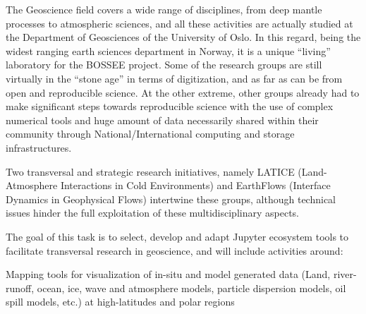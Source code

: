 \begin{task}[
  title=Geosciences application,
  id=geoscience,
  lead=UIO,
  PM=24,
  wphases={0-48},
  partners={UIO,QS,SRL}
]



The Geoscience field covers a wide range of disciplines, from deep
mantle processes to atmospheric sciences, and all these activities are
actually studied at the Department of Geosciences of the University of
Oslo. In this regard, being the widest ranging earth sciences
department in Norway, it is a unique “living” laboratory for the
BOSSEE project. Some of the research groups are still virtually in the
“stone age” in terms of digitization, and as far as can be from open
and reproducible science. At the other extreme, other groups already
had to make significant steps towards reproducible science with the
use of complex numerical tools and huge amount of data necessarily
shared within their community through National/International computing
and storage infrastructures.

Two transversal and strategic research initiatives, namely LATICE
(Land-Atmosphere Interactions in Cold Environments) and EarthFlows
(Interface Dynamics in Geophysical Flows) intertwine these groups,
although technical issues hinder the full exploitation of these
multidisciplinary aspects.

The goal of this task is to select, develop and adapt Jupyter
ecosystem tools to facilitate transversal research in geoscience, and
will include activities around:

  \begin{compactitem}
  \item Mapping tools for visualization of in-situ and model generated
    data (Land, river-runoff, ocean, ice, wave and atmosphere models,
    particle dispersion models, oil spill models, etc.)  at
    high-latitudes and polar regions


\end{compactitem}
\end{task}
